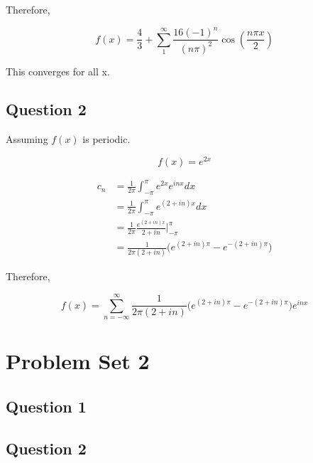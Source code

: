 \documentclass[titlepage]{article}
\begin{document}
Therefore,

$$f(x) = \frac{4}{3} + \sum_1^{\infty} \frac{16 (-1)^n}{(n\pi)^2}\cos(\frac{n\pi x}{2})$$

This converges for all x.
\subsection*{Question 2}

Assuming $f(x)$ is periodic.

$$f(x) = e^{2x}$$

\begin{align*}
    c_n &= \frac{1}{2\pi} \int_{-\pi}^{\pi} e^{2x}e^{inx} dx
    \\ &= \frac{1}{2\pi} \int_{-\pi}^{\pi} e^{(2 + in)x} dx
    \\ &= \frac{1}{2\pi} \frac{e^{(2 + in)x}}{2 + in} \bigg|_{-\pi}^{\pi}
    \\ &= \frac{1}{2\pi(2 + in)}\bigg(e^{(2 + in)\pi} - e^{-(2 + in)\pi}\bigg)
\end{align*}

Therefore,

$$f(x) = \sum_{n=-\infty}^{\infty} \frac{1}{2\pi(2 + in)}\bigg(e^{(2 + in)\pi} - e^{-(2 + in)\pi}\bigg) e^{inx}$$
\section*{Problem Set 2}
\subsection*{Question 1}
\subsection*{Question 2}
\end{document}
